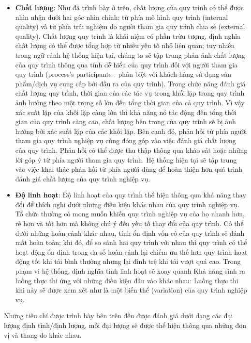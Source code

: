 \begin{itemize}
      \item \textbf{Chất lượng}: Như đã trình bày ở trên, chất lượng của quy trình có thể được nhìn nhận dưới hai góc nhìn chính: từ phía mô hình quy trình (internal quality) và từ phía trải nghiệm do người tham gia quy trình chia sẻ (external quality). Chất lượng quy trình là khái niệm có phần trừu tượng, định nghĩa chất lượng có thể được tổng hợp từ nhiều yếu tố nhỏ liên quan; tuy nhiên trong ngữ cảnh hệ thống hiện tại, chúng ta sẽ tập trung phản ánh chất lượng của quy trình thông qua tính dễ hiểu của quy trình đối với người tham gia quy trình (process's participants - phân biệt với khách hàng sử dụng sản phẩm/dịch vụ cung cấp bởi đầu ra của quy trình). Trong chức năng đánh giá chất lượng quy trình, thời gian của các tác vụ trong khối lặp trong quy trình ảnh hưởng theo một trọng số lớn đến tổng thời gian của cả quy trình. Vì vậy xác suất lặp của khối lặp càng lớn thì khả năng nó tác động đến tổng thời gian của quy trình càng cao, chất lượng bên trong của quy trình sẽ bị ảnh hưởng bởi xác suất lặp của các khối lặp. Bên cạnh đó, phản hồi từ phía người tham gia quy trình nghiệp vụ cũng đóng góp vào việc đánh giá chất lượng của quy trình. Phản hồi có thể được thu thập thông qua khảo sát hoặc những lời góp ý từ phía người tham gia quy trình. Hệ thống hiện tại sẽ tập trung vào việc khai thác phản hồi từ phía người dùng để hoàn thiện hơn quá trình đánh giá chất lượng của quy trình nghiệp vụ.
      \item \textbf{Độ linh hoạt}: Độ linh hoạt của quy trình thể hiện thông qua khả năng thay đổi để thích nghi dưới những điều kiện khác nhau của quy trình nghiệp vụ. Tổ chức thường có mong muốn khiến quy trình nghiệp vụ của họ nhanh hơn, rẻ hơn và tốt hơn mà không chú ý đến yếu tố thay đổi của quy trình. Có thể dưới những hoàn cảnh khác nhau, tính ổn định vốn có của quy trình sẽ đánh mất hoàn toàn; khi đó, để so sánh hai quy trình với nhau thì quy trình có thể hoạt động ổn định trong đa số hoàn cảnh lại chiếm ưu thế hơn quy trình hoạt động tốt khi tải bình thường nhưng lại đình trệ khi tải vượt quá cao. Trong phạm vi hệ thống, định nghĩa tính linh hoạt sẽ xoay quanh Khả năng sinh ra luồng thực thi ứng với những điều kiện đầu vào khác nhau: Luồng thực thi khi này sẽ được xem xét như là một biến thể (variation) của quy trình nghiệp vụ.
\end{itemize}

Những tiêu chí được trình bày bên trên đều được đánh giá dưới dạng các đại lượng định tính/định lượng, mỗi đại lượng sẽ được thể hiện thông qua những đơn vị và thang đo khác nhau.


